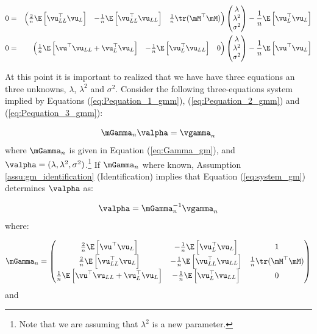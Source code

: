 \documentclass[english,12pt]{book}\usepackage[]{graphicx}\usepackage[]{xcolor}
\begin{document}
\begin{eqnarray}
 0 & = & \begin{pmatrix}
            \frac{2}{n}\E\left[\vu^\top_{LL}\vu_L\right] & -\frac{1}{n}\E\left[\vu_{LL}^\top\vu_{LL}\right] & \frac{1}{n} \tr(\mM^\top\mM)
          \end{pmatrix}
                      \begin{pmatrix}
              \lambda \\
              \lambda^2 \\
              \sigma^2
            \end{pmatrix} - \frac{1}{n}\E\left[\vu^\top_L\vu_L\right]\label{eq:Pequation_2_gmm} \\
 0 & = & \begin{pmatrix}
            \frac{1}{n}\E\left[\vu^\top\vu_{LL} + \vu_L^\top\vu_L\right] & - \frac{1}{n}\E\left[\vu_{L}^\top\vu_{LL}\right] & 0
          \end{pmatrix}
                      \begin{pmatrix}
              \lambda \\
              \lambda^2 \\
              \sigma^2
            \end{pmatrix} - \frac{1}{n}\E\left[\vu^\top\vu_L\right]\label{eq:Pequation_3_gmm}
\end{eqnarray}

At this point it is important to realized that we have have three equations an three unknowns, $\lambda$, $\lambda^2$ and $\sigma^2$. Consider the following three-equations system implied by Equations (\ref{eq:Pequation_1_gmm}), (\ref{eq:Pequation_2_gmm}) and (\ref{eq:Pequation_3_gmm}):

\begin{equation}\label{eq:system_gm}
  \mGamma_n\valpha  = \vgamma_n
\end{equation}
%
where $\mGamma_n$ is given in Equation (\ref{eq:Gamma_gm}), and $\valpha = (\lambda, \lambda^2, \sigma^2)$.\footnote{Note that we are assuming that $\lambda^2$ is a new parameter.} If $\mGamma_n$ where known, Assumption \ref{assu:gm_identification} (Identification) implies that Equation (\ref{eq:system_gm}) determines $\valpha$ as:


\begin{equation*}
\valpha = \mGamma_n^{-1}\vgamma_n
\end{equation*}
%
where:

\begin{equation}\label{eq:Gamma_gm}
  \mGamma_n = \begin{pmatrix}
   \frac{2}{n}\E\left[\vu^\top\vu_L\right] & -\frac{1}{n}\E\left[\vu_L^\top\vu_L\right] & 1 \\
   \frac{2}{n}\E\left[\vu^\top_{LL}\vu_L\right] & -\frac{1}{n}\E\left[\vu_{LL}^\top\vu_{LL}\right] & \frac{1}{n} \tr(\mM^\top\mM)\\
   \frac{1}{n}\E\left[\vu^\top\vu_{LL} + \vu_L^\top\vu_L\right] & -\frac{1}{n}\E\left[\vu_{L}^\top\vu_{LL}\right] & 0
        \end{pmatrix}
\end{equation}
%
and
\end{document}

